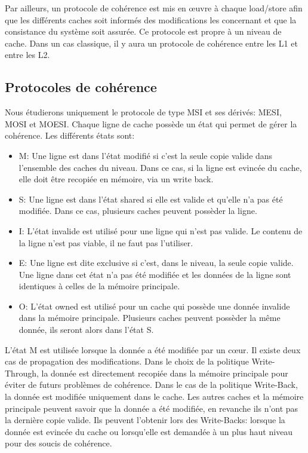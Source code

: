 \documentclass[a4paper]{article}
\begin{document}
\indent Par ailleurs, un protocole de cohérence est mis en {\oe}uvre à chaque load/store afin que les différents caches soit informés des modifications les concernant et que la consistance du système soit assurée. Ce protocole est propre à un niveau de cache. Dans un cas classique, il y aura un protocole de cohérence entre les L1 et entre les L2.

\subsection{Protocoles de cohérence}
\indent Nous étudierons uniquement le protocole de type MSI et ses dérivés: MESI, MOSI et MOESI. Chaque ligne de cache possède un état qui permet de gérer la cohérence. Les différents états sont: \\
\begin{itemize}
\item M: Une ligne est dans l'état modifié si c'est la seule copie valide dans l'ensemble des caches du niveau. Dans ce cas, si la ligne est evincée du cache, elle doit être recopiée en mémoire, via un write back. \\
\item S: Une ligne est dans l'état shared si elle est valide et qu'elle n'a pas été modifiée. Dans ce cas, plusieurs caches peuvent possèder la ligne. \\
\item I: L'état invalide est utilisé pour une ligne qui n'est pas valide. Le contenu de la ligne n'est pas viable, il ne faut pas l'utiliser. \\
\item E: Une ligne est dite exclusive si c'est, dans le niveau, la seule copie valide. Une ligne dans cet état n'a pas été modifiée et les données de la ligne sont identiques à celles de la mémoire principale. \\
\item O: L'état owned est utilisé pour un cache qui possède une donnée invalide dans la mémoire principale. Plusieurs caches peuvent possèder la même donnée, ils seront alors dans l'état S. \\
\end{itemize}

\indent L'état M est utilisée lorsque la donnée a été modifiée par un c{\oe}ur. Il existe deux cas de propagation des modifications. Dans le choix de la politique Write-Through, la donnée est directement recopiée dans la mémoire principale pour éviter de futurs problèmes de cohérence. Dans le cas de la politique Write-Back, la donnée est modifiée uniquement dans le cache. Les autres caches et la mémoire principale peuvent savoir que la donnée a été modifiée, en revanche ils n'ont pas la dernière copie valide. Ils peuvent l'obtenir lors des Write-Backs: lorsque la donnée est evincée du cache ou lorsqu'elle est demandée à un plus haut niveau pour des soucis de cohérence.
\end{document}
